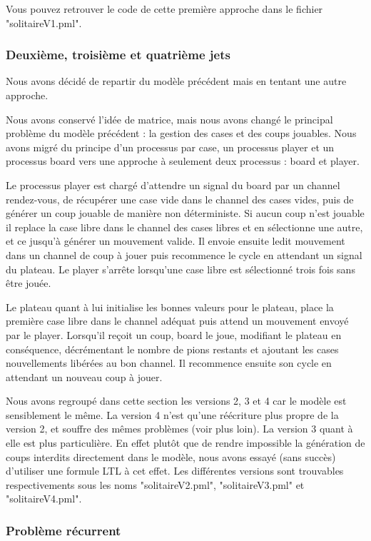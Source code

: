 \documentclass[12pt, a4paper]{report}
\begin{document}
Vous pouvez retrouver le code de cette première approche dans le fichier "solitaireV1.pml".

\subsubsection{Deuxième, troisième et quatrième jets}

Nous avons décidé de repartir du modèle précédent mais en tentant une autre approche.

Nous avons conservé l'idée de matrice, mais nous avons changé le principal problème du modèle précédent : la gestion des cases et des coups jouables. Nous avons migré du principe d'un processus par case, un processus player et un processus board vers une approche à seulement deux processus : board et player.

Le processus player est chargé d'attendre un signal du board par un channel rendez-vous, de récupérer une case vide dans le channel des cases vides, puis de générer un coup jouable de manière non déterministe. Si aucun coup n'est jouable il replace la case libre dans le channel des cases libres et en sélectionne une autre, et ce jusqu'à générer un mouvement valide. Il envoie ensuite ledit mouvement dans un channel de coup à jouer puis recommence le cycle en attendant un signal du plateau. Le player s'arrête lorsqu'une case libre est sélectionné trois fois sans être jouée.

Le plateau quant à lui initialise les bonnes valeurs pour le plateau, place la première case libre dans le channel adéquat puis attend un mouvement envoyé par le player. Lorsqu'il reçoit un coup, board le joue, modifiant le plateau en conséquence, décrémentant le nombre de pions restants et ajoutant les cases nouvellements libérées au bon channel. Il recommence ensuite son cycle en attendant un nouveau coup à jouer.

Nous avons regroupé dans cette section les versions 2, 3 et 4 car le modèle est sensiblement le même. La version 4 n'est qu'une réécriture plus propre de la version 2, et souffre des mêmes problèmes (voir plus loin). La version 3 quant à elle est plus particulière. En effet plutôt que de rendre impossible la génération de coups interdits directement dans le modèle, nous avons essayé (sans succès) d'utiliser une formule LTL à cet effet.
Les différentes versions sont trouvables respectivements sous les noms "solitaireV2.pml", "solitaireV3.pml" et "solitaireV4.pml".

\subsubsection{Problème récurrent}
\end{document}
